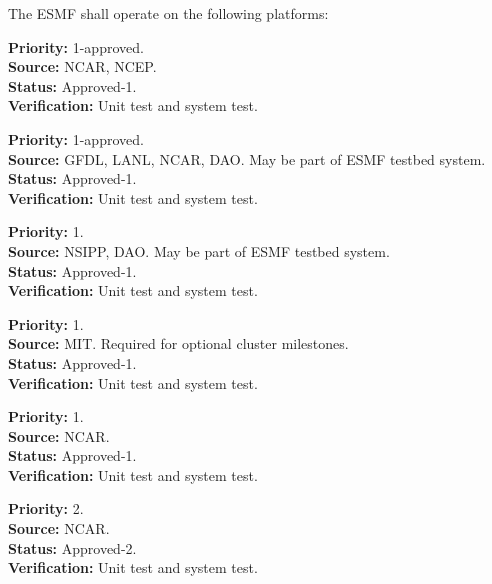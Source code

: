 The ESMF shall operate on the following platforms:

\begin{reqlist}
{\bf Priority:} 1-approved. \\
{\bf Source:} NCAR, NCEP. \\
{\bf Status:} Approved-1. \\
{\bf Verification:} Unit test and system test.
\end{reqlist}

\begin{reqlist}
{\bf Priority:} 1-approved. \\
{\bf Source:} GFDL, LANL, NCAR, DAO.  May be part of ESMF testbed system. \\
{\bf Status:} Approved-1. \\
{\bf Verification:} Unit test and system test.
\end{reqlist}

\begin{reqlist}
{\bf Priority:} 1. \\
{\bf Source:} NSIPP, DAO.  May be part of ESMF testbed system. \\
{\bf Status:} Approved-1. \\
{\bf Verification:} Unit test and system test.
\end{reqlist}

\begin{reqlist}
{\bf Priority:} 1. \\
{\bf Source:} MIT.  Required for optional cluster milestones. \\
{\bf Status:} Approved-1. \\
{\bf Verification:} Unit test and system test.
\end{reqlist}

\begin{reqlist}
{\bf Priority:} 1. \\
{\bf Source:} NCAR. \\
{\bf Status:} Approved-1. \\
{\bf Verification:} Unit test and system test.
\end{reqlist}

\begin{reqlist}
{\bf Priority:} 2. \\
{\bf Source:} NCAR. \\
{\bf Status:} Approved-2. \\
{\bf Verification:} Unit test and system test.
\end{reqlist}

